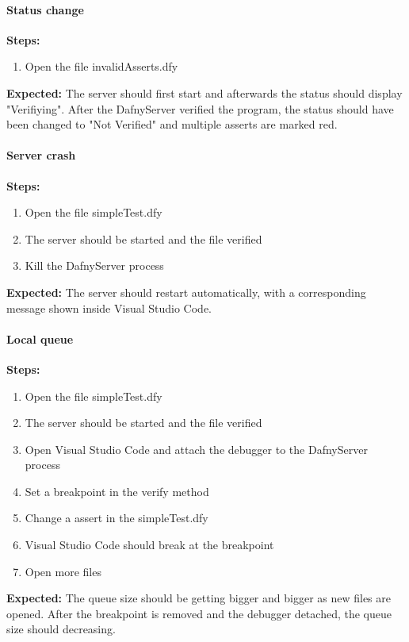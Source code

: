 \paragraph{Status change}
\textbf{\newline Steps:}
\begin{enumerate}
	\item Open the file invalidAsserts.dfy
	
\end{enumerate}
\textbf{\newline Expected:}
The server should first start and afterwards the status should display "Verifiying". After the DafnyServer verified the program, the status should have been changed to "Not Verified" and multiple asserts are marked red. 

\paragraph{Server crash}
\textbf{\newline Steps:}
\begin{enumerate}
	\item Open the file simpleTest.dfy
	\item The server should be started and the file verified
	\item Kill the DafnyServer process
\end{enumerate}
\textbf{\newline Expected:}
The server should restart automatically, with a corresponding message shown inside Visual Studio Code. 


\paragraph{Local queue}
\textbf{\newline Steps:}
\begin{enumerate}
	\item Open the file simpleTest.dfy
	\item The server should be started and the file verified
	\item Open Visual Studio Code and attach the debugger to the DafnyServer process
	\item Set a breakpoint in the verify method
	\item Change a assert in the simpleTest.dfy 
	\item Visual Studio Code should break at the breakpoint
	\item Open more files
\end{enumerate}
\textbf{\newline Expected:}
The queue size should be getting bigger and bigger as new files are opened. After the breakpoint is removed and the debugger detached, the queue size should decreasing. 

